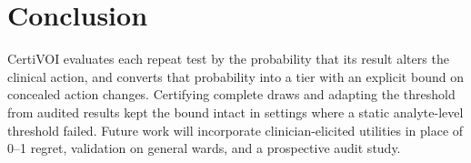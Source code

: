 \documentclass[conference]{IEEEtran}
\begin{document}
\section{Conclusion}
CertiVOI evaluates each repeat test by the probability that its result alters the clinical action, and converts that probability into a tier with an explicit bound on concealed action changes. Certifying complete draws and adapting the threshold from audited results kept the bound intact in settings where a static analyte-level threshold failed. Future work will incorporate clinician-elicited utilities in place of 0--1 regret, validation on general wards, and a prospective audit study.




\makeatletter
{}
\makeatother
\end{document}
